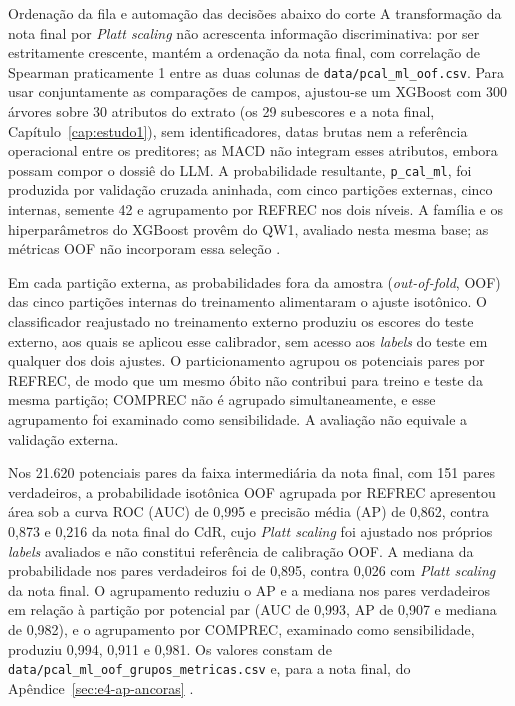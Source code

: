 \begin{chapter}{Ordenação da fila e automação das decisões abaixo do corte}
A transformação da nota final por \textit{Platt scaling} não acrescenta informação discriminativa: por ser estritamente crescente, mantém a ordenação da nota final, com correlação de Spearman praticamente 1 entre as duas colunas de \texttt{data/pcal\_ml\_oof.csv}. Para usar conjuntamente as comparações de campos, ajustou-se um XGBoost com 300 árvores sobre 30 atributos do extrato (os 29 subescores e a nota final, Capítulo~\ref{cap:estudo1}), sem identificadores, datas brutas nem a referência operacional entre os preditores; as MACD não integram esses atributos, embora possam compor o dossiê do LLM. A probabilidade resultante, \texttt{p\_cal\_ml}, foi produzida por validação cruzada aninhada, com cinco partições externas, cinco internas, semente 42 e agrupamento por REFREC nos dois níveis. A família e os hiperparâmetros do XGBoost provêm do QW1, avaliado nesta mesma base; as métricas OOF não incorporam essa seleção \cite{Jardim2026phdrepo}.

Em cada partição externa, as probabilidades fora da amostra (\textit{out-of-fold}, OOF) das cinco partições internas do treinamento alimentaram o ajuste isotônico. O classificador reajustado no treinamento externo produziu os escores do teste externo, aos quais se aplicou esse calibrador, sem acesso aos \textit{labels} do teste em qualquer dos dois ajustes. O particionamento agrupou os potenciais pares por REFREC, de modo que um mesmo óbito não contribui para treino e teste da mesma partição; COMPREC não é agrupado simultaneamente, e esse agrupamento foi examinado como sensibilidade. A avaliação não equivale a validação externa.

Nos 21.620 potenciais pares da faixa intermediária da nota final, com 151 pares verdadeiros, a probabilidade isotônica OOF agrupada por REFREC apresentou área sob a curva ROC (AUC) de 0,995 e precisão média (AP) de 0,862, contra 0,873 e 0,216 da nota final do CdR, cujo \textit{Platt scaling} foi ajustado nos próprios \textit{labels} avaliados e não constitui referência de calibração OOF. A mediana da probabilidade nos pares verdadeiros foi de 0,895, contra 0,026 com \textit{Platt scaling} da nota final. O agrupamento reduziu o AP e a mediana nos pares verdadeiros em relação à partição por potencial par (AUC de 0,993, AP de 0,907 e mediana de 0,982), e o agrupamento por COMPREC, examinado como sensibilidade, produziu 0,994, 0,911 e 0,981. Os valores constam de \texttt{data/pcal\_ml\_oof\_grupos\_metricas.csv} e, para a nota final, do Apêndice~\ref{sec:e4-ap-ancoras} \cite{Jardim2026phdrepo}.


\end{chapter}
